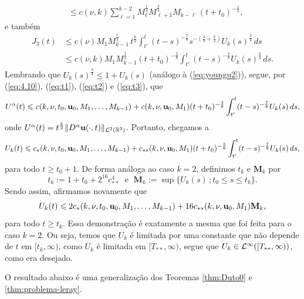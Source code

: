\begin{prf}
\begin{equation}
\begin{aligned}
            &\leqslant c(\nu,k) \sum_{\ell=1}^{k-2} M_{\ell}^{\frac{1}{4}} M_{\ell + 1}^{\frac{3}{4}} M_{k-\ell} \, (t + t_0)^{-\frac{1}{4}},
        \end{aligned}
    \end{equation}
    e também
    \begin{equation} \label{eq:t3}
        \begin{aligned}
            J_3(t) &\leqslant c(\nu) M_1 M_{k-1}^{\frac{1}{4}} \, t^{\frac{k}{2}} \int_{t'}^{t} (t - s)^{-\frac{7}{8}} s^{-\left( \frac{3}{8} + \frac{k}{2} \right)} U_k(s)^{\frac{3}{4}} \,ds\\
            &\leqslant c(\nu,k) M_1 M_{k-1}^{\frac{1}{4}} (t + t_0)^{-\frac{3}{8}} \int_{t'}^t (t - s)^{-\frac{7}{8}} U_k(s)^{\frac{3}{4}}\,ds.
        \end{aligned}
    \end{equation}
    Lembrando que $U_k(s)^{\frac{3}{4}} \leqslant 1 + U_k(s)$ (análogo à (\ref{eq:youngu2})), segue, por (\ref{eq:4.10}), (\ref{eq:t1}), (\ref{eq:t2}) e (\ref{eq:t3}), que
    \[
        U^\alpha(t) \leqslant c(k,\nu, t_0, \mathbf{u}_0, M_1,\dots,M_{k-1}) + c(k,\nu,\mathbf{u}_0, M_1) (t + t_0)^{-\frac{3}{8}} \int_{t'}^t (t-s)^{-\frac{7}{8}} U_k(s)\,ds,
    \]
    onde $U^\alpha(t) = t^{\frac{k}{2}} \Vert D^\alpha \mathbf{u}(\cdot,t) \Vert_{\mathcal{L}^2(\mathbb{R}^3)}$.
    Portanto, chegamos a
    \[
        U_k(t) \leqslant c_*(k,\nu, t_0, \mathbf{u}_0, M_1,\dots,M_{k-1}) + c_{**}(k,\nu,\mathbf{u}_0, M_1) (t + t_0)^{-\frac{3}{8}} \int_{t'}^t (t-s)^{-\frac{7}{8}} U_k(s)\,ds,
    \]
    para todo $t \geqslant t_0 + 1$.
    De forma análoga ao caso $k = 2$, definimos $t_k$ e $\mathbf{M}_k$ por
    \[
        t_k := 1 + t_0 + 2^{16}c_{**}^4 \;\text{ e }\; \mathbf{M}_k := \sup \{U_k(s) \,; t_0 \leqslant s \leqslant t_k\}.
    \]
    Sendo assim, afirmamos novamente que
    \begin{equation} \label{eq:B6}
        U_k(t) \leqslant 2c_*(k,\nu,t_0,\mathbf{u}_0,M_1,\dots,M_{k-1}) + 16 c_{**} (k,\nu,\mathbf{u}_0,M_1) \mathbf{M}_k,
    \end{equation}
    para todo $t \geqslant t_k$.
    Essa demonstração é exatamente a mesma que foi feita para o caso $k = 2$.
    Ou seja, temos que $U_k$ é limitada por uma constante que não depende de $t$ em $[t_k,\infty)$, como $U_k$ é limitada em $[T_{**}, \infty)$, segue que $U_k \in \mathcal{L}^\infty([T_{**}, \infty))$, como era desejado.
\end{prf}

O resultado abaixo é uma generalização dos Teoremas \ref{thm:Duto0} e \ref{thm:problema-leray}.

